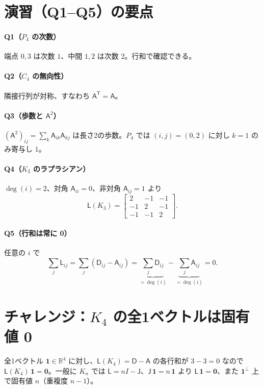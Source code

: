\documentclass[12pt]{ltjsarticle}
\newcommand{\1}{\mathbf{1}}
\newcommand{\R}{\mathbb{R}}
\newcommand{\A}{\mathsf{A}}
\newcommand{\D}{\mathsf{D}}
\newcommand{\Lapl}{\mathsf{L}}
\newcommand{\J}{\mathsf{J}}
\begin{document}
\section{演習（Q1–Q5）の要点}
\paragraph{Q1（$P_4$ の次数）} 端点 $0,3$ は次数 $1$、中間 $1,2$ は次数 $2$。行和で確認できる。

\paragraph{Q2（$C_4$ の無向性）} 隣接行列が対称、すなわち $\A^{\mathsf{T}}=\A$。

\paragraph{Q3（歩数と $\A^2$）} $(\A^2)_{ij}=\sum_k \A_{ik}\A_{kj}$ は長さ2の歩数。$P_4$ では $(i,j)=(0,2)$ に対し $k=1$ のみ寄与し $1$。

\paragraph{Q4（$K_3$ のラプラシアン）} $\deg(i)=2$、対角 $\A_{ii}=0$、非対角 $\A_{ij}=1$ より
\[
  \Lapl(K_3)=\begin{bmatrix}2&-1&-1\\-1&2&-1\\-1&-1&2\end{bmatrix}.
\]

\paragraph{Q5（行和は常に 0）} 任意の $i$ で
\[
  \sum_j \Lapl_{ij} = \sum_j (\D_{ij}-\A_{ij})
  = \underbrace{\sum_j \D_{ij}}_{=\deg(i)} - \underbrace{\sum_j \A_{ij}}_{=\deg(i)} = 0.
\]

\section{チャレンジ：$K_4$ の全1ベクトルは固有値 0}
全1ベクトル $\1\in\R^4$ に対し、$\Lapl(K_4)=\D-\A$ の各行和が $3-3=0$ なので $\Lapl(K_4)\,\1=\bm{0}$。一般に $K_n$ では $\Lapl=nI-\J$、$\J\,\1=n\,\1$ より $\Lapl\,\1=\bm{0}$、また $\1^{\perp}$ 上で固有値 $n$（重複度 $n-1$）。
\end{document}
